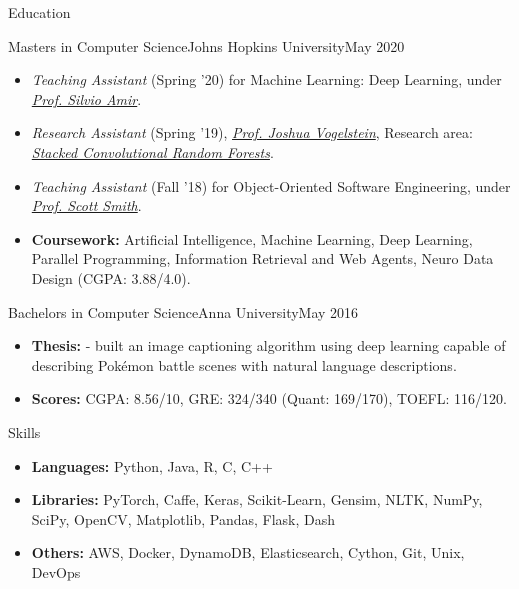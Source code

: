 \documentclass[]{mcdowellcv}
\begin{document}
\begin{cvsection}{Education}
		\begin{cvsubsection}{Masters in Computer Science}{Johns Hopkins University}{May 2020}
			\begin{itemize}
				\item \textit{Teaching Assistant} (Spring '20) for Machine Learning: Deep Learning, under \href{https://samiroid.github.io/}{\color{blue!70}\textit{Prof. Silvio Amir}}.
				\item \textit{Research Assistant} (Spring '19), \href{https://jovo.me/}{\color{blue!70}\textit{Prof. Joshua Vogelstein}}, Research area: \href{https://github.com/tpsatish95/deep-conv-rf}{\color{blue!70}\textit{Stacked Convolutional Random Forests}}.
				\item \textit{Teaching Assistant} (Fall '18) for Object-Oriented Software Engineering, under \href{https://samiroid.github.io/}{\color{blue!70}\textit{Prof. Scott Smith}}.
				\item \textbf{Coursework:} Artificial Intelligence, Machine Learning, Deep Learning, Parallel Programming, Information Retrieval and Web Agents, Neuro Data Design (CGPA: 3.88/4.0).
			\end{itemize}
		\end{cvsubsection}
		\begin{cvsubsection}{Bachelors in Computer Science}{Anna University}{May 2016}
			\begin{itemize}
				\item \textbf{Thesis:} \href{https://github.com/tpsatish95/image-captioning}{} - built an image captioning algorithm using deep learning capable of describing Pokémon battle scenes with natural language descriptions.
				\item \textbf{Scores:} CGPA: 8.56/10, GRE: 324/340 (Quant: 169/170), TOEFL: 116/120.
			\end{itemize}
		\end{cvsubsection}
	\end{cvsection}

    \begin{cvsection}{Skills}
		\begin{cvsubsection}{}{}{}
			\begin{itemize}
				\item \textbf{Languages:} Python, Java, R, C, C++ %
				\item \textbf{Libraries:} PyTorch, Caffe, Keras, Scikit-Learn, Gensim, NLTK, NumPy, SciPy, OpenCV, Matplotlib, Pandas, Flask, Dash
				\item \textbf{Others:} AWS, Docker, DynamoDB, Elasticsearch, Cython, Git, Unix, DevOps
			\end{itemize}
		\end{cvsubsection}
	\end{cvsection}
\end{document}
